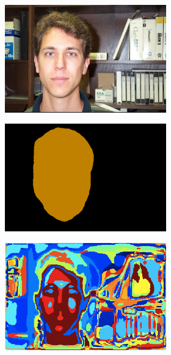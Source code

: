 \documentclass{article} %
\begin{document}
\begin{figure}
	\begin{subfigure}[c]{\textwidth}
		\centering
		\begin{subfigure}[c]{0.195\textwidth}
			\includegraphics[width = \textwidth]{./img/6_3_s.png}
			\label{fig:6_3_s}
		\end{subfigure}
		\begin{subfigure}[c]{0.195\textwidth}
			\includegraphics[width = \textwidth]{./img/6_3_s_GT.png}
			\label{fig:6_3_s_lab}
		\end{subfigure}
		\begin{subfigure}[c]{0.195\textwidth}
			\includegraphics[width = \textwidth]{./img/6_3_s_map.png}

\end{subfigure}
\end{subfigure}
\end{figure}
\end{document}
